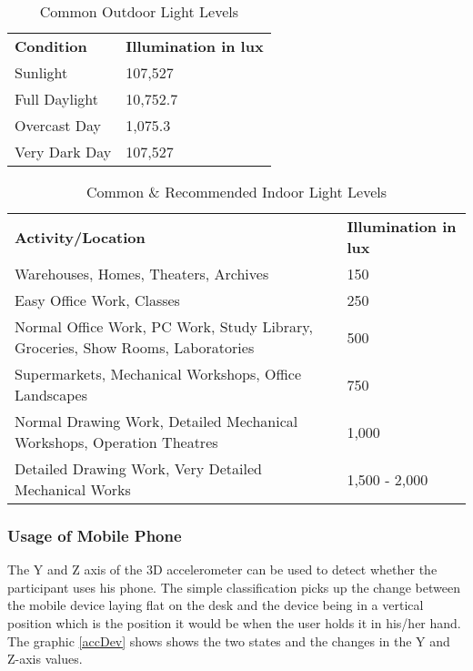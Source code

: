 \setlength{\tabcolsep}{10pt}
\renewcommand{\arraystretch}{1.5}
{

\begin{table}[!htb]
\centering
\begin{tabular}{ |p{4cm}|p{4cm}|  }
 \hline
 \rowcolor{lightgray} \multicolumn{2}{|c|}{{\bf Common Light Levels Outdoor - Daytime}} \\
 \hline
{\bf Condition} & {\bf Illumination in lux}\\
 \hline
 Sunlight   		& 107,527\\
 Full Daylight   	& 10,752.7\\
 Overcast Day	& 1,075.3\\
 Very Dark Day	& 107,527\\
 \hline
\end{tabular}
\caption{Common Outdoor Light Levels}
\label{outLight}
\end{table}

\begin{table}[!htb]
\centering
\begin{tabular}{ |p{10cm}|p{4cm}|  }
 \hline
 \rowcolor{lightgray} \multicolumn{2}{|c|}{{\bf Common and Recommended Light Levels Indoor}} \\
 \hline
{\bf Activity/Location} & {\bf Illumination in lux}\\
 \hline
 Warehouses, Homes, Theaters, Archives   																	& 150\\
 Easy Office Work, Classes   																						& 250\\
 Normal Office Work, PC Work, Study Library, Groceries, Show Rooms, Laboratories	& 500\\
 Supermarkets, Mechanical Workshops, Office Landscapes 											& 750\\
 Normal Drawing Work, Detailed Mechanical Workshops, Operation Theatres 				& 1,000\\
 Detailed Drawing Work, Very Detailed Mechanical Works 											& 1,500 - 2,000\\
 \hline
\end{tabular}
\caption{Common \& Recommended Indoor Light Levels}
\label{inLight}
\end{table}

\FloatBarrier
\clearpage

\subsubsection{Usage of Mobile Phone}
The Y and Z axis of the 3D accelerometer can be used to detect whether the participant uses his phone. The simple classification picks up the change between the mobile device laying flat on the desk and the device being in a vertical position which is the position it would be when the user holds it in his/her hand. The graphic \ref{accDev} shows shows the two states and the changes in the Y and Z-axis values. 

}
